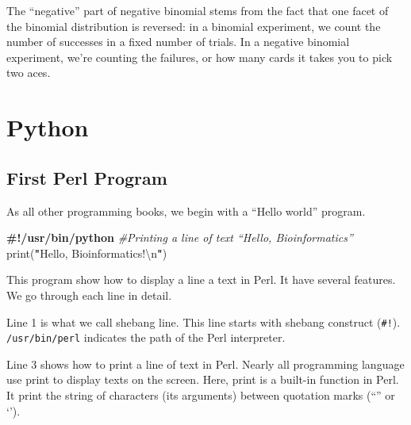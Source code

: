 \documentclass[]{book}
\makeatletter
\newenvironment{Shaded}{\begin{snugshade}}{\end{snugshade}}
\newcommand{\CharTok}[1]{\textcolor[rgb]{0.31,0.60,0.02}{#1}}
\newcommand{\CommentTok}[1]{\textcolor[rgb]{0.56,0.35,0.01}{\textit{#1}}}
\newcommand{\FunctionTok}[1]{\textcolor[rgb]{0.00,0.00,0.00}{#1}}
\newcommand{\KeywordTok}[1]{\textcolor[rgb]{0.13,0.29,0.53}{\textbf{#1}}}
\newcommand{\NormalTok}[1]{#1}
\newcommand{\StringTok}[1]{\textcolor[rgb]{0.31,0.60,0.02}{#1}}
\newenvironment{kframe}{%
\medskip{}
\setlength{\fboxsep}{.8em}
 \def\at@end@of@kframe{}%
 \ifinner\ifhmode%
  \def\at@end@of@kframe{\end{minipage}}%
  \begin{minipage}{\columnwidth}%
 \fi\fi%
 \def\FrameCommand##1{\hskip\@totalleftmargin \hskip-\fboxsep
 \colorbox{shadecolor}{##1}\hskip-\fboxsep
     \hskip-\linewidth \hskip-\@totalleftmargin \hskip\columnwidth}%
 \MakeFramed {\advance\hsize-\width
   \@totalleftmargin\z@ \linewidth\hsize
   \@setminipage}}%
 {\par\unskip\endMakeFramed%
 \at@end@of@kframe}
\renewenvironment{Shaded}{\begin{kframe}}{\end{kframe}}
\makeatother
\begin{document}
The ``negative'' part of negative binomial stems from the fact that one facet of the binomial distribution is reversed: in a binomial experiment, we count the number of successes in a fixed number of trials. In a negative binomial experiment, we're counting the failures, or how many cards it takes you to pick two aces.

\hypertarget{part-python}{%
\part{Python}\label{part-python}}

\hypertarget{first-perl-program-1}{%
\chapter{First Perl Program}\label{first-perl-program-1}}

As all other programming books, we begin with a ``Hello world'' program.

\begin{Shaded}
\begin{Highlighting}[]
\KeywordTok{#!/usr/bin/python}
\CommentTok{#Printing a line of text “Hello, Bioinformatics”}
\FunctionTok{print}\NormalTok{(}\KeywordTok{"}\StringTok{Hello, Bioinformatics!}\CharTok{\textbackslash{}n}\KeywordTok{"}\NormalTok{)}
\end{Highlighting}
\end{Shaded}

This program show how to display a line a text in Perl. It have several features. We go through each line in detail.

Line 1 is what we call shebang line. This line starts with shebang construct (\texttt{\#!}). \texttt{/usr/bin/perl} indicates the path of the Perl interpreter.

Line 3 shows how to print a line of text in Perl. Nearly all programming language use print to display texts on the screen. Here, print is a built-in function in Perl. It print the string of characters (its arguments) between quotation marks (``'' or `').


\end{document}
